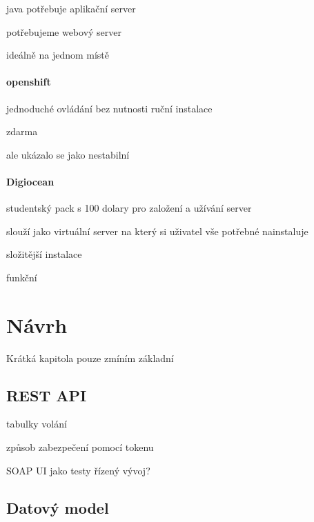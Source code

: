 \documentclass[thesis=B,czech]{FITthesis}[2012/06/26]
\begin{document}
java potřebuje aplikační server

potřebujeme webový server

ideálně na jednom místě

\subsubsection{openshift}

jednoduché ovládání bez nutnosti ruční instalace

zdarma

ale ukázalo se jako nestabilní

\subsubsection{Digiocean}

studentský pack s 100 dolary pro založení a užívání server

slouží jako virtuální server na který si uživatel vše potřebné nainstaluje

složitější instalace

funkční 

\chapter{Návrh}

Krátká kapitola pouze zmíním základní 

\section{REST API}

tabulky volání

způsob zabezpečení pomocí tokenu

SOAP UI jako testy řízený vývoj?

\section{Datový model}
\end{document}
